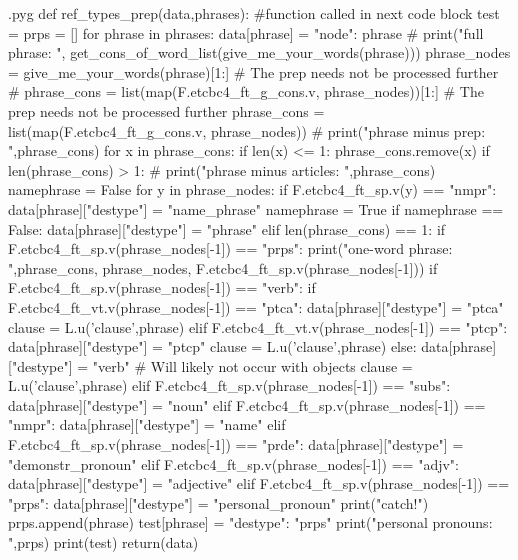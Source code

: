\documentclass{report}
\makeatletter
\newenvironment{python}{%
  \VerbatimEnvironment
  \minted@resetoptions
  \setkeys{minted@opt}{}
      \begin{VerbatimOut}{\jobname.pyg}}
{%
      \end{VerbatimOut}
      \minted@pygmentize{python}
      \DeleteFile{\jobname.pyg}}
\makeatother
\begin{document}
\begin{python}
def ref_types_prep(data,phrases): #function called in next code block
    test = {}
    prps = []
    for phrase in phrases:
        data[phrase] = {"node": phrase}
#        print("full phrase: ", get_cons_of_word_list(give_me_your_words(phrase)))
        phrase_nodes = give_me_your_words(phrase)[1:] # The prep needs not be processed further
#        phrase_cons = list(map(F.etcbc4_ft_g_cons.v, phrase_nodes))[1:] # The prep needs not be processed further
        phrase_cons = list(map(F.etcbc4_ft_g_cons.v, phrase_nodes))
#        print("phrase minus prep: ",phrase_cons)
        for x in phrase_cons:
            if len(x) <= 1:
                phrase_cons.remove(x)
        if len(phrase_cons) > 1:
#            print("phrase minus articles: ",phrase_cons)
            namephrase = False
            for y in phrase_nodes:
                if F.etcbc4_ft_sp.v(y) == "nmpr":
                    data[phrase]["destype"] = "name_phrase"
                    namephrase = True
            if namephrase == False:
                data[phrase]["destype"] = "phrase"
        elif len(phrase_cons) == 1:
            if F.etcbc4_ft_sp.v(phrase_nodes[-1]) == "prps":
                print("one-word phrase: ",phrase_cons, phrase_nodes, F.etcbc4_ft_sp.v(phrase_nodes[-1]))
            if F.etcbc4_ft_sp.v(phrase_nodes[-1]) == "verb":
                if F.etcbc4_ft_vt.v(phrase_nodes[-1]) == "ptca":
                    data[phrase]["destype"] = "ptca"
                    clause = L.u('clause',phrase)
                elif F.etcbc4_ft_vt.v(phrase_nodes[-1]) == "ptcp":
                    data[phrase]["destype"] = "ptcp"
                    clause = L.u('clause',phrase)
                else:
                    data[phrase]["destype"] = "verb" # Will likely not occur with objects
                    clause = L.u('clause',phrase)
            elif F.etcbc4_ft_sp.v(phrase_nodes[-1]) == "subs":
                data[phrase]["destype"] = "noun"
            elif F.etcbc4_ft_sp.v(phrase_nodes[-1]) == "nmpr":
                data[phrase]["destype"] = "name"
            elif F.etcbc4_ft_sp.v(phrase_nodes[-1]) == "prde":
                data[phrase]["destype"] = "demonstr_pronoun"
            elif F.etcbc4_ft_sp.v(phrase_nodes[-1]) == "adjv":
                data[phrase]["destype"] = "adjective"
            elif F.etcbc4_ft_sp.v(phrase_nodes[-1]) == "prps":
                data[phrase]["destype"] = "personal_pronoun"
                print("catch!")
                prps.append(phrase)
                test[phrase] = {"destype": "prps"}
    print("personal pronouns: ",prps)
    print(test)
    return(data)
                    

\end{python}
\end{document}
